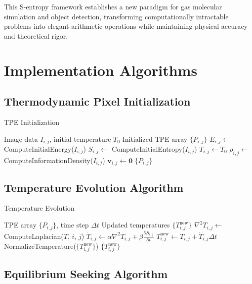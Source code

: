 \documentclass[12pt,a4paper]{article}
\begin{document}
This S-entropy framework establishes a new paradigm for gas molecular simulation and object detection, transforming computationally intractable problems into elegant arithmetic operations while maintaining physical accuracy and theoretical rigor.

\section{Implementation Algorithms}

\subsection{Thermodynamic Pixel Initialization}

\begin{algorithm}
\caption{TPE Initialization}
\begin{algorithmic}[1]
\REQUIRE Image data $I_{i,j}$, initial temperature $T_0$
\ENSURE Initialized TPE array $\{P_{i,j}\}$
    \STATE $E_{i,j} \leftarrow$ ComputeInitialEnergy($I_{i,j}$)
    \STATE $S_{i,j} \leftarrow$ ComputeInitialEntropy($I_{i,j}$)
    \STATE $T_{i,j} \leftarrow T_0$
    \STATE $\rho_{i,j} \leftarrow$ ComputeInformationDensity($I_{i,j}$)
    \STATE $\mathbf{v}_{i,j} \leftarrow \mathbf{0}$
\ENDFOR
\RETURN $\{P_{i,j}\}$
\end{algorithmic}
\end{algorithm}

\subsection{Temperature Evolution Algorithm}

\begin{algorithm}
\caption{Temperature Evolution}
\begin{algorithmic}[1]
\REQUIRE TPE array $\{P_{i,j}\}$, time step $\Delta t$
\ENSURE Updated temperatures $\{T_{i,j}^{\text{new}}\}$
    \STATE $\nabla^2 T_{i,j} \leftarrow$ ComputeLaplacian($T$, $i$, $j$)
    \STATE $\dot{T}_{i,j} \leftarrow \alpha \nabla^2 T_{i,j} + \beta \frac{\partial S_{i,j}}{\partial t}$
    \STATE $T_{i,j}^{\text{new}} \leftarrow T_{i,j} + \dot{T}_{i,j} \Delta t$
\ENDFOR
\STATE NormalizeTemperature($\{T_{i,j}^{\text{new}}\}$)
\RETURN $\{T_{i,j}^{\text{new}}\}$
\end{algorithmic}
\end{algorithm}

\subsection{Equilibrium Seeking Algorithm}
\end{document}
